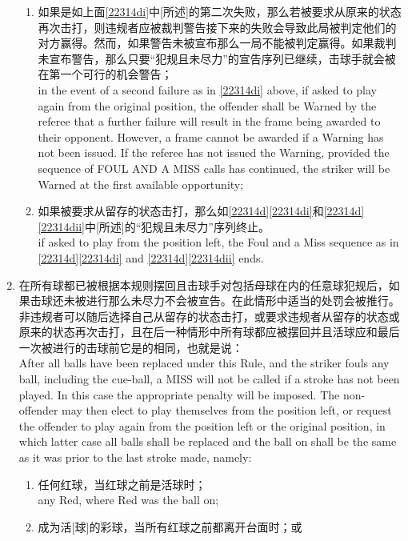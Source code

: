 \begin{enumerate}[label=(\alph*)]
\begin{enumerate}[label=(\roman*)]
        \item \label{22314dii}如果是如上面\ref{22314di}中[所述]的第二次失败，那么若被要求从原来的状态再次击打，则违规者应被裁判警告接下来的失败会导致此局被判定他们的对方赢得。然而，如果警告未被宣布那么一局不能被判定赢得。如果裁判未宣布警告，那么只要``犯规且未尽力''的宣告序列已继续，击球手就会被在第一个可行的机会警告；\\
        in the event of a second failure as in \ref{22314di} above, if asked to play again from the original position, the offender shall be Warned by the referee that a further failure will result in the frame being awarded to their opponent. However, a frame cannot be awarded if a Warning has not been issued. If the referee has not issued the Warning, provided the sequence of FOUL AND A MISS calls has continued, the striker will be Warned at the first available opportunity;
        \item 如果被要求从留存的状态击打，那么如\ref{22314d}\ref{22314di}和\ref{22314d} \ref{22314dii}中[所述]的``犯规且未尽力''序列终止。\\
        if asked to play from the position left, the Foul and a Miss sequence as in \ref{22314d}\ref{22314di} and \ref{22314d}\ref{22314dii} ends.
    \end{enumerate}
    \item \label{22314e}在所有球都已被根据本规则摆回且击球手对包括母球在内的任意球犯规后，如果击球还未被进行那么未尽力不会被宣告。在此情形中适当的处罚会被推行。非违规者可以随后选择自己从留存的状态击打，或要求违规者从留存的状态或原来的状态再次击打，且在后一种情形中所有球都应被摆回并且活球应和最后一次被进行的击球前它是的相同，也就是说：\\
    After all balls have been replaced under this Rule, and the striker fouls any ball, including the cue-ball, a MISS will not be called if a stroke has not been played. In this case the appropriate penalty will be imposed. The non-offender may then elect to play themselves from the position left, or request the offender to play again from the position left or the original position, in which latter case all balls shall be replaced and the ball on shall be the same as it was prior to the last stroke made, namely:
    \begin{enumerate}[label=(\roman*)]
        \item 任何红球，当红球之前是活球时；\\
        any Red, where Red was the ball on;
        \item 成为活[球]的彩球，当所有红球之前都离开台面时；或\\

\end{enumerate}
\end{enumerate}

